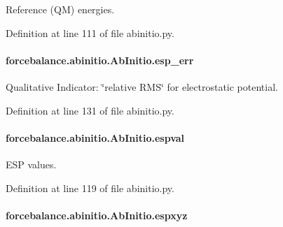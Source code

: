 Reference (Q\-M) energies. 



Definition at line 111 of file abinitio.\-py.

\hypertarget{classforcebalance_1_1abinitio_1_1AbInitio_abdc625c3149cee375b56b4e0d73034fe}{
\paragraph[{esp\-\_\-err}]{\setlength{\rightskip}{0pt plus 5cm}forcebalance.\-abinitio.\-Ab\-Initio.\-esp\-\_\-err\hspace{0.3cm}{\ttfamily [inherited]}}}\label{classforcebalance_1_1abinitio_1_1AbInitio_abdc625c3149cee375b56b4e0d73034fe}


Qualitative Indicator\-: \char`\"{}relative R\-M\-S\char`\"{} for electrostatic potential. 



Definition at line 131 of file abinitio.\-py.

\hypertarget{classforcebalance_1_1abinitio_1_1AbInitio_aba6d885086d455fce8c3d472fd08020d}{
\paragraph[{espval}]{\setlength{\rightskip}{0pt plus 5cm}forcebalance.\-abinitio.\-Ab\-Initio.\-espval\hspace{0.3cm}{\ttfamily [inherited]}}}\label{classforcebalance_1_1abinitio_1_1AbInitio_aba6d885086d455fce8c3d472fd08020d}


E\-S\-P values. 



Definition at line 119 of file abinitio.\-py.

\hypertarget{classforcebalance_1_1abinitio_1_1AbInitio_a8be2d088afb344036aae989ca3cbcc41}{
\paragraph[{espxyz}]{\setlength{\rightskip}{0pt plus 5cm}forcebalance.\-abinitio.\-Ab\-Initio.\-espxyz\hspace{0.3cm}{\ttfamily [inherited]}}}\label{classforcebalance_1_1abinitio_1_1AbInitio_a8be2d088afb344036aae989ca3cbcc41}


